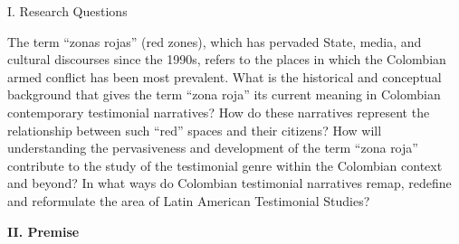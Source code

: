 \documentclass[
  11pt,
,
onecolumn,
openany
]{book}
\begin{document}
I. Research Questions

The term ``zonas rojas'' (red zones), which has pervaded State, media, and
cultural discourses since the 1990s, refers to the places in which the
Colombian armed conflict has been most prevalent. What is the historical and
conceptual background that gives the term ``zona roja'' its current meaning in
Colombian contemporary testimonial narratives? How do these narratives
represent the relationship between such ``red'' spaces and their citizens? How
will understanding the pervasiveness and development of the term ``zona roja''
contribute to the study of the testimonial genre within the Colombian context
and beyond? In what ways do Colombian testimonial narratives remap, redefine
and reformulate the area of Latin American Testimonial Studies?

\textbf{II. Premise}
\end{document}
